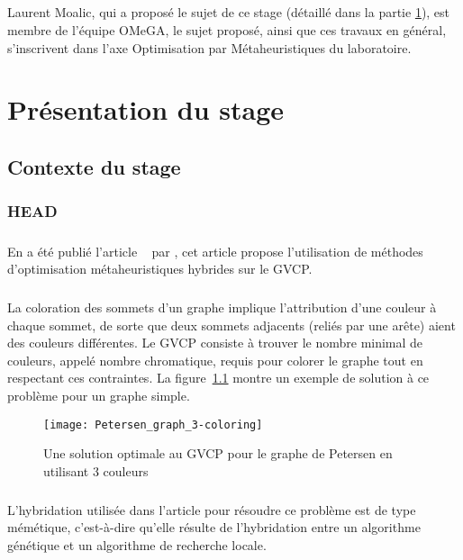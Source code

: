 \documentclass[a4paper,11pt,twoside,french,report]{../common/simplem}
\begin{document}
				\paragraph*{}
					Laurent Moalic, qui a proposé le sujet de ce stage (détaillé dans la partie \ref{sec:presentation_stage}), est membre de l'équipe \gls{OMeGA}, le sujet proposé, ainsi que ces travaux en général, s'inscrivent dans l'axe Optimisation par Métaheuristiques du laboratoire.
	\chapter{Présentation du stage}\label{sec:presentation_stage}
		\section{Contexte du stage}
			\subsection{\acrshort{HEAD}}\label{sec:head}
				\paragraph*{}
					En \citeyear{Moalic2018} a été publié l'article ~\cite{Moalic2018} par \citeauthor{Moalic2018}, cet article propose l'utilisation de méthodes d'optimisation métaheuristiques hybrides sur le \gls{GVCP}.
				\paragraph*{}
					La coloration des sommets d'un graphe implique l'attribution d'une couleur à chaque sommet, de sorte que deux sommets adjacents (reliés par une arête) aient des couleurs différentes. Le \gls{GVCP} consiste à trouver le nombre minimal de couleurs, appelé nombre chromatique, requis pour colorer le graphe tout en respectant ces contraintes. La figure~\ref{fig:Petersen_graph_3-coloring} montre un exemple de solution à ce problème pour un graphe simple.
					\begin{figure}[H]
						\centering%
						\texttt{[image: Petersen\_graph\_3-coloring]}%
						\caption{Une solution optimale au \acrshort{GVCP} pour le graphe de Petersen en utilisant 3 couleurs~\cite{wiki:Graphe_de_Petersen}}%
						\label{fig:Petersen_graph_3-coloring}%
					\end{figure}
				\paragraph*{}
					L'hybridation utilisée dans l'article pour résoudre ce problème est de type mémétique, c'est-à-dire qu'elle résulte de l'hybridation entre un algorithme génétique et un algorithme de recherche locale.
\end{document}
